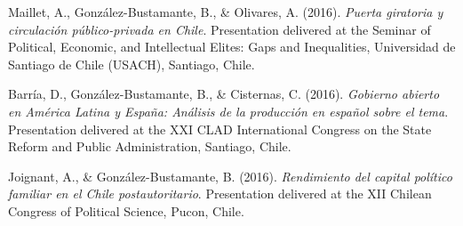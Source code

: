 \begin{publications}
\begin{benumerate}{87}

\item{Maillet, A., González-Bustamante, B., \& Olivares, A. (2016). {\itshape Puerta giratoria y circulación público-privada en Chile}. Presentation delivered at the Seminar of Political, Economic, and Intellectual Elites: Gaps and Inequalities, Universidad de Santiago de Chile (USACH), Santiago, Chile.}\vspace{1mm}


\item{Barría, D., González-Bustamante, B., \& Cisternas, C. (2016). {\itshape Gobierno abierto en América Latina y España: Análisis de la producción en español sobre el tema}. Presentation delivered at the XXI CLAD International Congress on the State Reform and Public Administration, Santiago, Chile.}\vspace{1mm}


\item{Joignant, A., \& González-Bustamante, B. (2016). {\itshape Rendimiento del capital político familiar en el Chile postautoritario}. Presentation delivered at the XII Chilean Congress of Political Science, Pucon, Chile.}\vspace{1mm}



\end{benumerate}
\end{publications}

